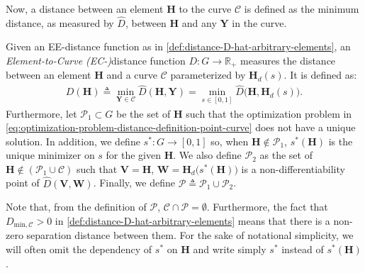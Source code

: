 Now, a distance between an element $\mathbf{H}$ to the curve $\mathcal{C}$ is defined as the minimum distance, as measured by $\widehat{D}$, between $\mathbf{H}$ and any $\mathbf{Y}$ in the curve. 
\begin{definition}\label{def:distance-D-element-curve}
    Given an EE-distance function as in \cref{def:distance-D-hat-arbitrary-elements}, an \emph{Element-to-Curve (EC-)}distance function $D: G\to\mathbb{R}_+$ measures the distance between an element $\mathbf{H}$ and a curve $\mathcal{C}$ parameterized by $\mathbf{H}_d(s)$. It is defined as:
    \begin{align}
        D(\mathbf{H}) \triangleq \min_{\mathbf{Y}\in\mathcal{C}}\widehat{D}(\mathbf{H}, \mathbf{Y}) =
        \min_{s\in[0,1]} \widehat{D}\bigl(\mathbf{H}, \mathbf{H}_d(s)\bigr).\label{eq:optimization-problem-distance-definition-point-curve}
    \end{align}
    Furthermore, let $\mathcal{P}_1\subset G$ be the set of $\mathbf{H}$ such that the optimization problem in \eqref{eq:optimization-problem-distance-definition-point-curve} does not have a unique solution. In addition, we define $s^*: G \to [0,1]$ so, when $\mathbf{H}\notin \mathcal{P}_1$, $s^*(\mathbf{H})$ is the unique minimizer on $s$ for the given $\mathbf{H}$. %
    We also define $\mathcal{P}_2$ as the set of $\mathbf{H} \not \in (\mathcal{P}_1 \cup \mathcal{C})$ such that $\mathbf{V} = \mathbf{H}$, $\mathbf{W} = \mathbf{H}_d\bigl(s^*(\mathbf{H})\bigr)$ is a non-differentiability point of $\widehat{D}(\mathbf{V},\mathbf{W})$. Finally, we define $\mathcal{P} \triangleq \mathcal{P}_1 \cup \mathcal{P}_2$.
\end{definition}
Note that, from the definition of $\mathcal{P}$, $\mathcal{C} \cap \mathcal{P} = \emptyset$. Furthermore, the fact that $D_{\text{min},\mathcal{C}}>0$ in \cref{def:distance-D-hat-arbitrary-elements} means that there is a non-zero separation distance between them. For the sake of notational simplicity, we will often omit the dependency of $s^*$ on $\mathbf{H}$ and write simply $s^*$ instead of $s^*(\mathbf{H})$.

